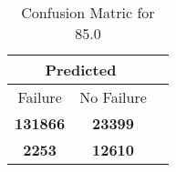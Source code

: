 \begin{table}[] 
\caption{Confusion Matric for 85.0} 
\label{Table: Prediction Accuracy-None85.0RandomForest100EKF-ignoreReflection-Reflection} 
\centering 
\begin{tabular} 
 {@{}ccc@{}} 
\toprule 
\multicolumn{2}{c}{\textbf{Predicted}}
 \\ \midrule 
\multicolumn{1}{|c|}{Failure} & 
\multicolumn{1}{c|}{No Failure}
 \\ \midrule 
\multicolumn{1}{|c|}{\color{green}\textbf{131866}} & 
\multicolumn{1}{c|}{\color{green}\textbf{23399}}
 \\ \midrule 
\multicolumn{1}{|c|}{\color{red}\textbf{2253}} & 
\multicolumn{1}{c|}{\color{red}\textbf{12610}}
 \\ \bottomrule 
\end{tabular} 
\end{table} 
